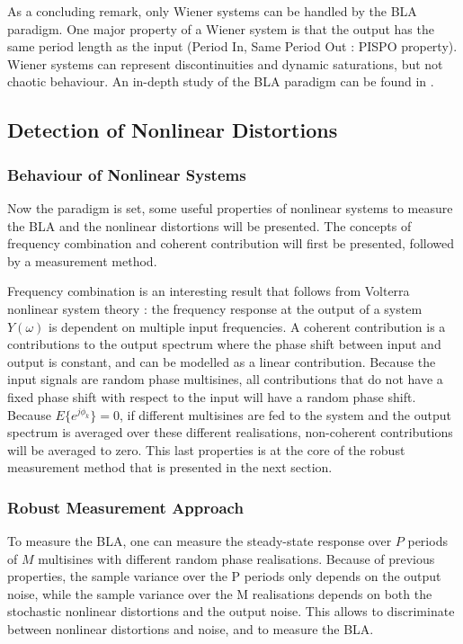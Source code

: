 	As a concluding remark, only Wiener systems can be handled by the BLA paradigm. One major property of a Wiener system is that the output has the same period length as the input (Period In, Same Period Out : PISPO property). Wiener systems can represent discontinuities and dynamic saturations, but not chaotic behaviour. An in-depth study of the BLA paradigm can be found in \cite{sysid}.

	\subsection{Detection of Nonlinear Distortions}
	
	\subsubsection{Behaviour of Nonlinear Systems}
	Now the paradigm is set, some useful properties of nonlinear systems to measure the BLA and the nonlinear distortions will be presented. The concepts of frequency combination and coherent contribution will first be presented, followed by a measurement method.

	Frequency combination is an interesting result that follows from Volterra nonlinear system theory : the frequency response at the output of a system $Y(\omega)$ is dependent on multiple input frequencies. 
	A coherent contribution is a contributions to the output spectrum where the phase shift between input and output is constant, and can be modelled as a linear contribution. 
	Because the input signals are random phase multisines, all contributions that do not have a fixed phase shift with respect to the input will have a random phase shift. Because $E\{e^{j\phi_k}\} = 0$, if different multisines are fed to the system and the output spectrum is averaged over these different realisations, non-coherent contributions will be averaged to zero. This last properties is at the core of the robust measurement method that is presented in the next section.

	\subsubsection{Robust Measurement Approach }

	To measure the BLA, one can measure  the steady-state response over $P$ periods of $M$ multisines with different random phase realisations. Because of previous properties, the sample variance over the P periods only depends on the output noise, while the sample variance over the M realisations depends on both the stochastic nonlinear distortions and the output noise. This allows to discriminate between nonlinear distortions and noise, and to measure the BLA.

